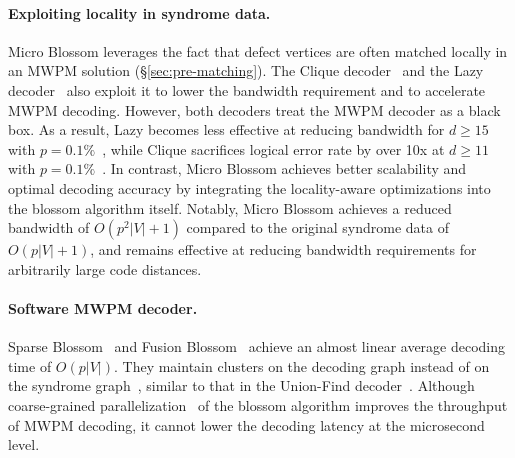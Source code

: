 \paragraph{Exploiting locality in syndrome data.} Micro Blossom leverages the fact that defect vertices are often matched locally in an MWPM solution (\S\ref{sec:pre-matching}).
The Clique decoder~\cite{ravi2023better} and the Lazy decoder~\cite{delfosse2020hierarchical} also exploit it to lower the bandwidth requirement and to accelerate MWPM decoding.
However, both decoders treat the MWPM decoder as a black box. As a result, Lazy becomes less effective at reducing bandwidth for $d \ge 15$ with $p=0.1\%$~\cite{delfosse2020hierarchical}, 
while Clique sacrifices logical error rate by over 10x at $d \ge 11$ with $p=0.1\%$~\cite{ravi2023better}.
In contrast, Micro Blossom achieves better scalability and optimal decoding accuracy by integrating the locality-aware optimizations into the blossom algorithm itself.
Notably, Micro Blossom achieves a reduced bandwidth of $O(p^2 |V| + 1)$ compared to the original syndrome data of $O(p|V| + 1)$, and remains effective at reducing bandwidth requirements for arbitrarily large code distances.

\paragraph{Software MWPM decoder.}
Sparse Blossom~\cite{higgott2025sparse} and Fusion Blossom~\cite{wu2023qce} achieve an almost linear average decoding time of $O(p |V|)$.
They maintain clusters on the decoding graph instead of on the syndrome graph~\cite{wu2022interpretation}, similar to that in the Union-Find decoder~\cite{delfosse2021almost}.
Although coarse-grained parallelization~\cite{wu2023qce} of the blossom algorithm improves the throughput of MWPM decoding, it cannot lower the decoding latency at the microsecond level.
